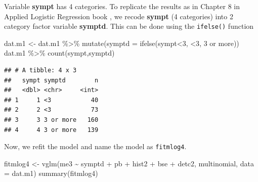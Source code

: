 \documentclass[
  10pt,
]{krantz}
\newenvironment{Shaded}{\begin{snugshade}}{\end{snugshade}}
\newcommand{\AttributeTok}[1]{\textcolor[rgb]{0.77,0.63,0.00}{#1}}
\newcommand{\DecValTok}[1]{\textcolor[rgb]{0.00,0.00,0.81}{#1}}
\newcommand{\FunctionTok}[1]{\textcolor[rgb]{0.00,0.00,0.00}{#1}}
\newcommand{\NormalTok}[1]{#1}
\newcommand{\OtherTok}[1]{\textcolor[rgb]{0.56,0.35,0.01}{#1}}
\newcommand{\SpecialCharTok}[1]{\textcolor[rgb]{0.00,0.00,0.00}{#1}}
\newcommand{\StringTok}[1]{\textcolor[rgb]{0.31,0.60,0.02}{#1}}
\begin{document}
Variable \textbf{sympt} has 4 categories. To replicate the results as in Chapter 8 in Applied Logistic Regression book \citep{Hosmer2013-03-22}, we recode \textbf{sympt} (4 categories) into 2 category factor variable \textbf{symptd}. This can be done using the \texttt{ifelse()} function

\begin{Shaded}
\begin{Highlighting}[]
\NormalTok{dat.m1 }\OtherTok{\textless{}{-}} 
\NormalTok{  dat.m1 }\SpecialCharTok{\%\textgreater{}\%} 
  \FunctionTok{mutate}\NormalTok{(}\AttributeTok{symptd =} \FunctionTok{ifelse}\NormalTok{(sympt}\SpecialCharTok{\textless{}}\DecValTok{3}\NormalTok{, }\StringTok{\textquotesingle{}\textless{}3\textquotesingle{}}\NormalTok{, }\StringTok{\textquotesingle{}3 or more\textquotesingle{}}\NormalTok{)) }
\NormalTok{dat.m1 }\SpecialCharTok{\%\textgreater{}\%}  
  \FunctionTok{count}\NormalTok{(sympt,symptd)}
\end{Highlighting}
\end{Shaded}

\begin{verbatim}
## # A tibble: 4 x 3
##   sympt symptd        n
##   <dbl> <chr>     <int>
## 1     1 <3           40
## 2     2 <3           73
## 3     3 3 or more   160
## 4     4 3 or more   139
\end{verbatim}

Now, we refit the model and name the model as \texttt{fitmlog4}.

\begin{Shaded}
\begin{Highlighting}[]
\NormalTok{fitmlog4 }\OtherTok{\textless{}{-}} \FunctionTok{vglm}\NormalTok{(me3 }\SpecialCharTok{\textasciitilde{}}\NormalTok{ symptd }\SpecialCharTok{+}\NormalTok{ pb }\SpecialCharTok{+}\NormalTok{ hist2 }\SpecialCharTok{+}\NormalTok{ bse }\SpecialCharTok{+}\NormalTok{ detc2,}
\NormalTok{                 multinomial, }\AttributeTok{data =}\NormalTok{ dat.m1)}
\FunctionTok{summary}\NormalTok{(fitmlog4)}
\end{Highlighting}
\end{Shaded}
\end{document}
